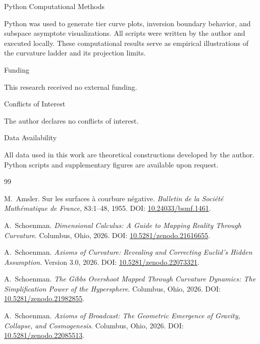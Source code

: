 \documentclass[final,onefignum,onetabnum]{siamart}
\begin{document}
\begin{section}{Python Computational Methods}

Python was used to generate tier curve plots, inversion boundary behavior, and subspace asymptote visualizations. All scripts were written by the author and executed locally. These computational results serve as empirical illustrations of the curvature ladder and its projection limits.
\end{section}

\begin{section}{Funding}

This research received no external funding.
\end{section}

\begin{section}{Conflicts of Interest}

The author declares no conflicts of interest.
\end{section}

\begin{section}{Data Availability}

All data used in this work are theoretical constructions developed by the author. Python scripts and supplementary figures are available upon request.
\end{section}

\begin{thebibliography}{99}

M.~Amsler.
\newblock Sur les surfaces à courbure négative.
\newblock \emph{Bulletin de la Société Mathématique de France}, 83:1--48, 1955.
\newblock DOI: \href{https://doi.org/10.24033/bsmf.1461}{10.24033/bsmf.1461}.

A.~Schoenman.
\newblock \emph{Dimensional Calculus: A Guide to Mapping Reality Through Curvature}.
\newblock Columbus, Ohio, 2026.
\newblock DOI: \href{https://doi.org/10.5281/zenodo.21616655}{10.5281/zenodo.21616655}.

A.~Schoenman.
\newblock \emph{Axioms of Curvature: Revealing and Correcting Euclid's Hidden Assumption}.
\newblock Version 3.0, 2026.
\newblock DOI: \href{https://doi.org/10.5281/zenodo.22073321}{10.5281/zenodo.22073321}.

A.~Schoenman.
\newblock \emph{The Gibbs Overshoot Mapped Through Curvature Dynamics: The Simplification Power of the Hypersphere}.
\newblock Columbus, Ohio, 2026.
\newblock DOI: \href{https://doi.org/10.5281/zenodo.21982855}{10.5281/zenodo.21982855}.

A.~Schoenman.
\newblock \emph{Axioms of Broadcast: The Geometric Emergence of Gravity, Collapse, and Cosmogenesis}.
\newblock Columbus, Ohio, 2026.
\newblock DOI: \href{https://doi.org/10.5281/zenodo.22085513}{10.5281/zenodo.22085513}.

\end{thebibliography}
\end{document}
